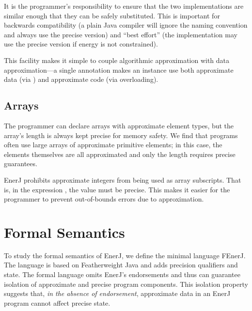 It is the programmer's responsibility to ensure that the two
implementations are similar enough that they can be safely substituted.
This is important for backwards compatibility
(a plain Java compiler will ignore the naming convention and always
use the precise version) and ``best effort'' (the implementation may
use the precise version if energy is not constrained).

This facility makes it simple to couple algorithmic approximation with
data approximation---a single annotation makes an instance use both
approximate data (via ) and approximate code (via
overloading).

\subsection{Arrays}
The programmer can declare arrays with approximate element types, but
the array's length is always kept precise for memory safety.
We find that programs often
use large arrays of approximate primitive elements; in this case, the
elements themselves are all approximated and only the length requires
precise guarantees.

EnerJ prohibits approximate integers from being used as array
subscripts. That is, in the expression , the value  must
be precise. This makes it easier for the programmer to
prevent out-of-bounds errors due to approximation.




\section{Formal Semantics}
\label{semantics}
To study the formal semantics of EnerJ, we define the minimal language
FEnerJ. The language is based on Featherweight Java \cite{IgarashiEA01}
and adds precision qualifiers and state. The formal language omits
EnerJ's endorsements and thus can guarantee isolation of approximate and
precise program components. This isolation property suggests that,
\emph{in the absence of endorsement}, approximate data in an EnerJ program
cannot affect precise state.

